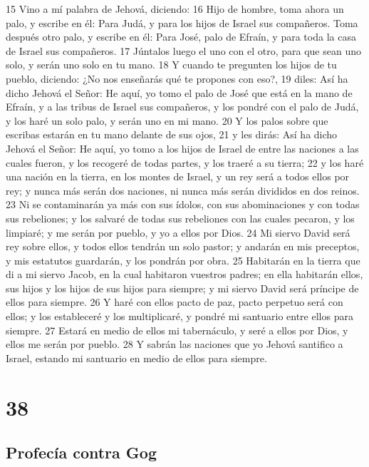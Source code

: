 15 Vino a mí palabra de Jehová, diciendo:
16 Hijo de hombre, toma ahora un palo, y escribe en él: Para Judá, y para los hijos de Israel sus compañeros. Toma después otro palo, y escribe en él: Para José, palo de Efraín, y para toda la casa de Israel sus compañeros.
17 Júntalos luego el uno con el otro, para que sean uno solo, y serán uno solo en tu mano.
18 Y cuando te pregunten los hijos de tu pueblo, diciendo: ¿No nos enseñarás qué te propones con eso?,
19 diles: Así ha dicho Jehová el Señor: He aquí, yo tomo el palo de José que está en la mano de Efraín, y a las tribus de Israel sus compañeros, y los pondré con el palo de Judá, y los haré un solo palo, y serán uno en mi mano.
20 Y los palos sobre que escribas estarán en tu mano delante de sus ojos,
21 y les dirás: Así ha dicho Jehová el Señor: He aquí, yo tomo a los hijos de Israel de entre las naciones a las cuales fueron, y los recogeré de todas partes, y los traeré a su tierra;
22 y los haré una nación en la tierra, en los montes de Israel, y un rey será a todos ellos por rey; y nunca más serán dos naciones, ni nunca más serán divididos en dos reinos.
23 Ni se contaminarán ya más con sus ídolos, con sus abominaciones y con todas sus rebeliones; y los salvaré de todas sus rebeliones con las cuales pecaron, y los limpiaré; y me serán por pueblo, y yo a ellos por Dios.
24 Mi siervo David será rey sobre ellos, y todos ellos tendrán un solo pastor; y andarán en mis preceptos, y mis estatutos guardarán, y los pondrán por obra.
25 Habitarán en la tierra que di a mi siervo Jacob, en la cual habitaron vuestros padres; en ella habitarán ellos, sus hijos y los hijos de sus hijos para siempre; y mi siervo David será príncipe de ellos para siempre.
26 Y haré con ellos pacto de paz, pacto perpetuo será con ellos; y los estableceré y los multiplicaré, y pondré mi santuario entre ellos para siempre.
27 Estará en medio de ellos mi tabernáculo, y seré a ellos por Dios, y ellos me serán por pueblo. 
28 Y sabrán las naciones que yo Jehová santifico a Israel, estando mi santuario en medio de ellos para siempre.

\chapter{38}

\section*{Profecía contra Gog}

